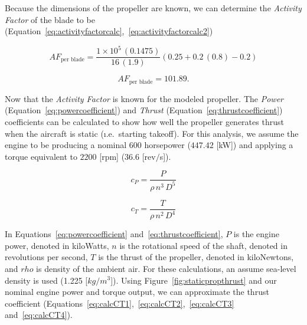 Because the dimensions of the propeller are known, we can determine the \textit{Activity Factor} of the blade to be (Equation~\ref{eq:activityfactorcalc},~\ref{eq:activityfactorcalc2})

\begin{equation}\label{eq:activityfactorcalc}
    AF_{\textrm{per blade}} = \frac{1 \times 10^5 \, (0.1475)}{16 \, (1.9)} \left(0.25 + 0.2 \, (0.8) - 0.2 \right)
\end{equation}

\begin{equation}\label{eq:activityfactorcalc2}
    AF_{\textrm{per blade}} = 101.89.
\end{equation}

Now that the \textit{Activity Factor} is known for the modeled propeller. The \textit{Power} (Equation~\ref{eq:powercoefficient}) and \textit{Thrust} (Equation~\ref{eq:thrustcoefficient}) coefficients can be calculated to show how well the propeller generates thrust when the aircraft is static (\i.e.\ starting takeoff). For this analysis, we assume the engine to be producing a nominal \(600\) horsepower (\(447.42\) [kW]) and applying a torque equivalent to \(2200\) [rpm] (\(36.6\) [rev\(/\)s]).

\begin{equation}\label{eq:powercoefficient}
    c_P = \frac{P}{\rho \, n^3 \, D^5}
\end{equation}

\begin{equation}\label{eq:thrustcoefficient}
    c_T = \frac{T}{\rho \, n^2 \, D^4}
\end{equation}

In Equations~\ref{eq:powercoefficient} and~\ref{eq:thrustcoefficient}, \(P\) is the engine power, denoted in kiloWatts, \(n\) is the rotational speed of the shaft, denoted in revolutions per second, \(T\) is the thrust of the propeller, denoted in kiloNewtons, and \( rho \) is density of the ambient air. For these calculations, an assume sea-level density is used (1.225 [\(kg/m^3\)]). Using Figure~\ref{fig:staticpropthrust} and our nominal engine power and torque output, we can approximate the thrust coefficient (Equations~\ref{eq:calcCT1},~\ref{eq:calcCT2},~\ref{eq:calcCT3} and~\ref{eq:calcCT4}).

